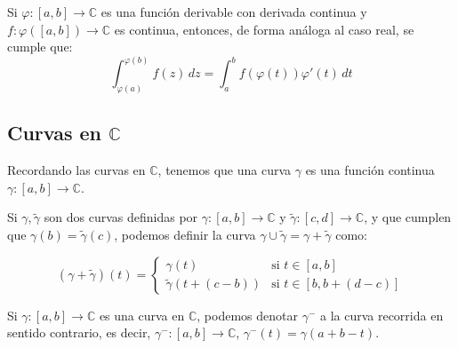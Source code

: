 \begin{observación}
    Si $\varphi: [a, b] \to \mathbb{C}$ es una función derivable con derivada continua y $f: \varphi([a, b]) \to \mathbb{C}$ es continua, entonces, de forma análoga al caso real, se cumple que:
    \[
    \int_{\varphi (a)}^{\varphi (b)} f(z) \, dz = \int_a^b f(\varphi(t)) \varphi'(t) \, dt
    \]
\end{observación}

\subsection{Curvas en $\mathbb{C}$}

Recordando las curvas en $\mathbb{C}$, tenemos que una curva $\gamma$ es una función continua $\gamma: [a, b] \to \mathbb{C}$.


\begin{definición}
    Si $\gamma, \tilde{\gamma}$ son dos curvas definidas por $\gamma: [a, b] \to \mathbb{C}$ y $\tilde{\gamma}: [c, d] \to \mathbb{C}$, y que cumplen que $\gamma(b) = \tilde{\gamma}(c)$, podemos definir la curva $\gamma \cup \tilde{\gamma} = \gamma + \tilde{\gamma}$ como:

    \[
    (\gamma + \tilde{\gamma})(t) =
    \begin{cases}
    \gamma(t) & \text{si } t \in [a, b] \\
    \tilde{\gamma}(t + (c - b)) & \text{si } t \in [b, b + (d - c)]
    \end{cases}
    \]
\end{definición}

\begin{definición}
    Si $\gamma: [a, b] \to \mathbb{C}$ es una curva en $\mathbb{C}$, podemos denotar $\gamma^-$ a la curva recorrida en sentido contrario, es decir, $\gamma^-: [a, b] \to \mathbb{C}$, $\gamma^-(t) = \gamma(a + b - t)$.
\end{definición}

